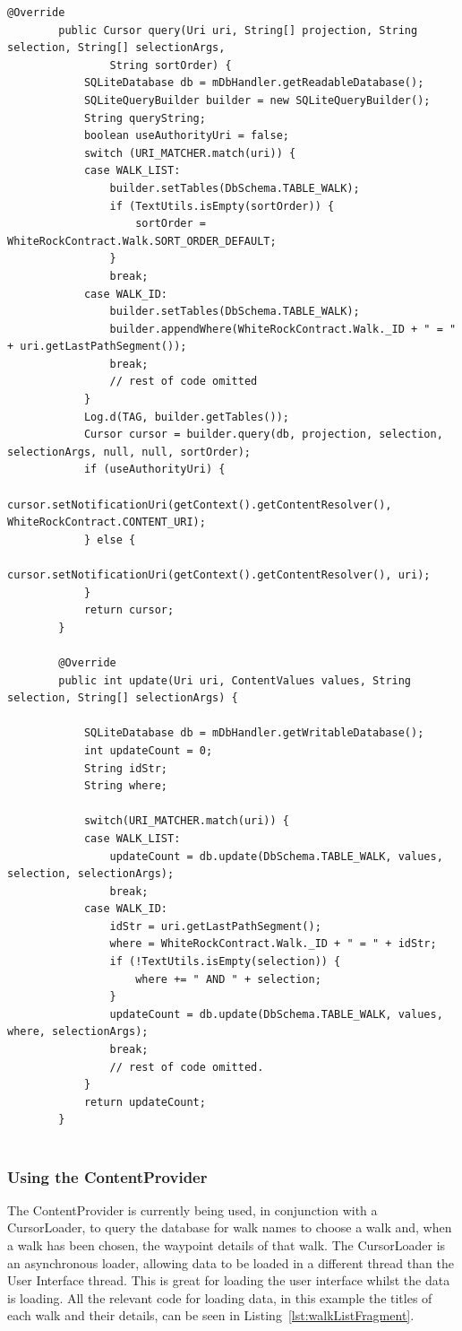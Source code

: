 \documentclass[11pt,a4paper]{article}
\begin{document}
\begin{lstlisting}[captionpos=b, caption=WhiteRockContentProvider Snippet, label=lst:contentprovider, frame=single]
		@Override
		public Cursor query(Uri uri, String[] projection, String selection, String[] selectionArgs,
				String sortOrder) {
			SQLiteDatabase db = mDbHandler.getReadableDatabase();
			SQLiteQueryBuilder builder = new SQLiteQueryBuilder();
			String queryString;
			boolean useAuthorityUri = false;
			switch (URI_MATCHER.match(uri)) {
			case WALK_LIST:
				builder.setTables(DbSchema.TABLE_WALK);
				if (TextUtils.isEmpty(sortOrder)) {
					sortOrder = WhiteRockContract.Walk.SORT_ORDER_DEFAULT;
				}
				break;
			case WALK_ID:
				builder.setTables(DbSchema.TABLE_WALK);
				builder.appendWhere(WhiteRockContract.Walk._ID + " = " + uri.getLastPathSegment());
				break;
				// rest of code omitted
			}
			Log.d(TAG, builder.getTables());
			Cursor cursor = builder.query(db, projection, selection, selectionArgs, null, null, sortOrder);
			if (useAuthorityUri) {
				cursor.setNotificationUri(getContext().getContentResolver(), WhiteRockContract.CONTENT_URI);
			} else {
				cursor.setNotificationUri(getContext().getContentResolver(), uri);
			}
			return cursor;
		}
		
		@Override
		public int update(Uri uri, ContentValues values, String selection, String[] selectionArgs) {
	
			SQLiteDatabase db = mDbHandler.getWritableDatabase();
			int updateCount = 0;
			String idStr;
			String where;
	
			switch(URI_MATCHER.match(uri)) {
			case WALK_LIST:
				updateCount = db.update(DbSchema.TABLE_WALK, values, selection, selectionArgs);
				break;
			case WALK_ID:
				idStr = uri.getLastPathSegment();
				where = WhiteRockContract.Walk._ID + " = " + idStr;
				if (!TextUtils.isEmpty(selection)) {
					where += " AND " + selection;
				}
				updateCount = db.update(DbSchema.TABLE_WALK, values, where, selectionArgs);
				break;
				// rest of code omitted.
			}
			return updateCount;
		}
	
\end{lstlisting}

\subsubsection{Using the ContentProvider}
The ContentProvider is currently being used, in conjunction with a CursorLoader, to query the database for walk names to choose a walk and, when a walk has been chosen, the waypoint details of that walk. The CursorLoader is an asynchronous loader, allowing data to be loaded in a different thread than the User Interface thread. This is great for loading the user interface whilst the data is loading. All the relevant code for loading data, in this example the titles of each walk and their details, can be seen in Listing~\ref{lst:walkListFragment}.
\end{document}
